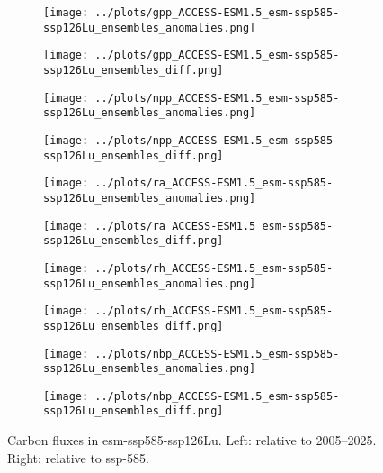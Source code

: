 \documentclass[]{article}
\begin{document}
\begin{figure}[H]
    \centering
    \begin{subfigure}[b]{0.4\linewidth}
        \texttt{[image: ../plots/gpp\_ACCESS-ESM1.5\_esm-ssp585-ssp126Lu\_ensembles\_anomalies.png]}
    \end{subfigure}
    \begin{subfigure}[b]{0.4\linewidth}
        \texttt{[image: ../plots/gpp\_ACCESS-ESM1.5\_esm-ssp585-ssp126Lu\_ensembles\_diff.png]}
    \end{subfigure}
    \begin{subfigure}[b]{0.4\linewidth}
        \texttt{[image: ../plots/npp\_ACCESS-ESM1.5\_esm-ssp585-ssp126Lu\_ensembles\_anomalies.png]}
    \end{subfigure}
    \begin{subfigure}[b]{0.4\linewidth}
        \texttt{[image: ../plots/npp\_ACCESS-ESM1.5\_esm-ssp585-ssp126Lu\_ensembles\_diff.png]}
    \end{subfigure}
    \begin{subfigure}[b]{0.4\linewidth}
        \texttt{[image: ../plots/ra\_ACCESS-ESM1.5\_esm-ssp585-ssp126Lu\_ensembles\_anomalies.png]}
    \end{subfigure}
    \begin{subfigure}[b]{0.4\linewidth}
        \texttt{[image: ../plots/ra\_ACCESS-ESM1.5\_esm-ssp585-ssp126Lu\_ensembles\_diff.png]}
    \end{subfigure}
    \begin{subfigure}[b]{0.4\linewidth}
        \texttt{[image: ../plots/rh\_ACCESS-ESM1.5\_esm-ssp585-ssp126Lu\_ensembles\_anomalies.png]}
    \end{subfigure}
    \begin{subfigure}[b]{0.4\linewidth}
        \texttt{[image: ../plots/rh\_ACCESS-ESM1.5\_esm-ssp585-ssp126Lu\_ensembles\_diff.png]}
    \end{subfigure}
    \begin{subfigure}[b]{0.4\linewidth}
        \texttt{[image: ../plots/nbp\_ACCESS-ESM1.5\_esm-ssp585-ssp126Lu\_ensembles\_anomalies.png]}
    \end{subfigure}
    \begin{subfigure}[b]{0.4\linewidth}
        \texttt{[image: ../plots/nbp\_ACCESS-ESM1.5\_esm-ssp585-ssp126Lu\_ensembles\_diff.png]}
    \end{subfigure}
    \caption{Carbon fluxes in esm-ssp585-ssp126Lu.  Left: relative to 2005–2025. Right: relative to ssp-585.}
    \label{fig:access_cflux}
\end{figure}
\end{document}
